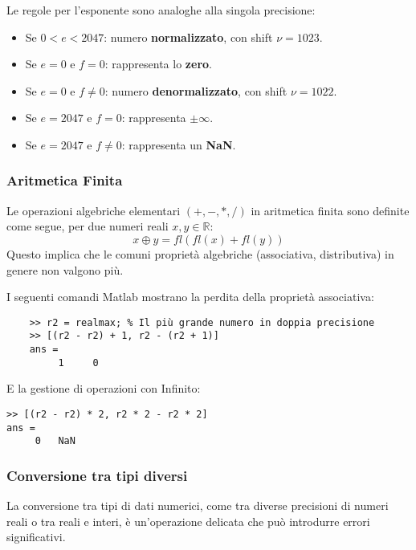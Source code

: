 Le regole per l'esponente sono analoghe alla singola precisione:
\begin{itemize}
    \item Se $0 < e < 2047$: numero \textbf{normalizzato}, con shift $\nu = 1023$.
    \item Se $e=0$ e $f=0$: rappresenta lo \textbf{zero}.
    \item Se $e=0$ e $f \neq 0$: numero \textbf{denormalizzato}, con shift $\nu = 1022$.
    \item Se $e=2047$ e $f=0$: rappresenta $\pm\infty$.
    \item Se $e=2047$ e $f \neq 0$: rappresenta un \textbf{NaN}.
\end{itemize}

\subsubsection{Aritmetica Finita}
Le operazioni algebriche elementari $(+, -, *, /)$ in aritmetica finita sono definite come segue, per due numeri reali $x, y \in \mathbb{R}$:
$$ x \oplus y = fl(fl(x) + fl(y)) $$
Questo implica che le comuni proprietà algebriche (associativa, distributiva) in genere non valgono più.

\begin{osservazione}
I seguenti comandi Matlab mostrano la perdita della proprietà associativa:
\begin{lstlisting}
    >> r2 = realmax; % Il più grande numero in doppia precisione
    >> [(r2 - r2) + 1, r2 - (r2 + 1)]
    ans =
         1     0
    \end{lstlisting}
E la gestione di operazioni con Infinito:
\begin{lstlisting}
>> [(r2 - r2) * 2, r2 * 2 - r2 * 2]
ans =
     0   NaN
\end{lstlisting}
\end{osservazione}


\subsubsection{Conversione tra tipi diversi}
La conversione tra tipi di dati numerici, come tra diverse precisioni di numeri reali o tra reali e interi, è un'operazione delicata che può introdurre errori significativi.

